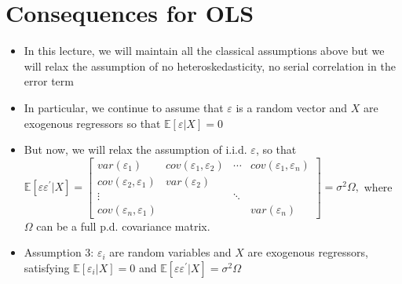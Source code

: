 \documentclass[notes=show]{beamer}
\begin{document}
\section{Consequences for OLS}

\begin{frame}%


\begin{itemize}
\item In this lecture, we will maintain all the classical assumptions above
but we will relax the assumption of no heteroskedasticity, no serial
correlation in the error term

\item In particular, we continue to assume that $\varepsilon $ is a random
vector and $X$ are exogenous regressors so that $\mathbb{E}[\varepsilon
|X]=0 $

\item But now, we will relax the assumption of i.i.d. $\varepsilon $, so
that $\mathbb{E}[\varepsilon \varepsilon ^{\prime }|X]=\left[ 
\begin{array}{cccc}
var(\varepsilon _{1}) & cov(\varepsilon _{1},\varepsilon _{2}) & \cdots & 
cov(\varepsilon _{1},\varepsilon _{n}) \\ 
cov(\varepsilon _{2},\varepsilon _{1}) & var(\varepsilon _{2}) &  &  \\ 
\vdots &  & \ddots &  \\ 
cov(\varepsilon _{n},\varepsilon _{1}) &  &  & var(\varepsilon _{n})%
\end{array}%
\right] =\sigma ^{2}\Omega ,$ where $\Omega $ can be a full p.d. covariance
matrix.

\item Assumption 3: $\varepsilon _{i}$ are random variables and $X$ are
exogenous regressors, satisfying $\mathbb{E}[\varepsilon _{i}|X]=0$ and $%
\mathbb{E}[\varepsilon \varepsilon ^{\prime }|X]=\sigma ^{2}\Omega $
\end{itemize}

\end{frame}%
\end{document}
